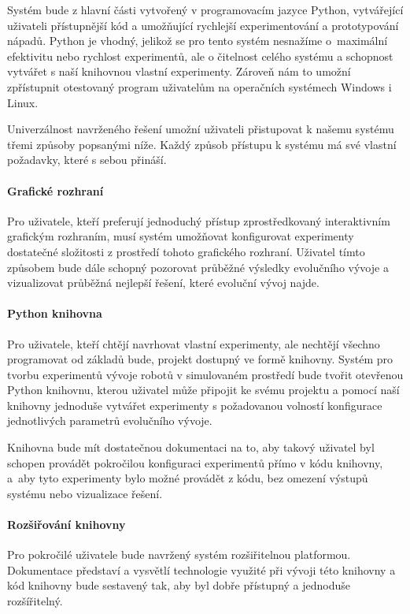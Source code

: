 Systém bude z hlavní části vytvořený v programovacím jazyce Python, vytvářející
uživateli přístupnější kód a umožňující rychlejší experimentování a
prototypování nápadů. Python je vhodný, jelikož se pro tento systém nesnažíme
o~maximální efektivitu nebo rychlost experimentů, ale o čitelnost celého
systému a schopnost vytvářet s naší knihovnou vlastní experimenty. Zároveň nám
to umožní zpřístupnit otestovaný program uživatelům na operačních systémech
Windows i Linux.

Univerzálnost navrženého řešení umožní uživateli přistupovat k našemu systému
třemi způsoby popsanými níže. Každý způsob přístupu k systému má své vlastní
požadavky, které s sebou přináší. 

\paragraph{Grafické rozhraní}
Pro uživatele, kteří preferují jednoduchý přístup zprostředkovaný interaktivním
grafickým rozhraním, musí systém umožňovat konfigurovat experimenty dostatečné
složitosti z prostředí tohoto grafického rozhraní. Uživatel tímto způsobem bude
dále schopný pozorovat průběžné výsledky evolučního vývoje a vizualizovat
průběžná nejlepší řešení, které evoluční vývoj najde.

\paragraph{Python knihovna}
Pro uživatele, kteří chtějí navrhovat vlastní experimenty, ale nechtějí všechno
programovat od základů bude, projekt dostupný ve formě knihovny. Systém pro
tvorbu experimentů vývoje robotů v simulovaném prostředí bude tvořit otevřenou
Python knihovnu, kterou uživatel může připojit ke svému projektu a pomocí naší
knihovny jednoduše vytvářet experimenty s požadovanou volností konfigurace
jednotlivých parametrů evolučního vývoje.

Knihovna bude mít dostatečnou dokumentaci na to, aby takový uživatel byl
schopen provádět pokročilou konfiguraci experimentů přímo v kódu knihovny,
a~aby tyto experimenty bylo možné provádět z kódu, bez omezení výstupů systému
nebo vizualizace řešení.

\paragraph{Rozšiřování knihovny}
Pro pokročilé uživatele bude navržený systém rozšiřitelnou platformou. Dokumentace
představí a vysvětlí technologie využité při vývoji této knihovny a kód
knihovny bude sestavený tak, aby byl dobře přístupný a jednoduše rozšířitelný.
